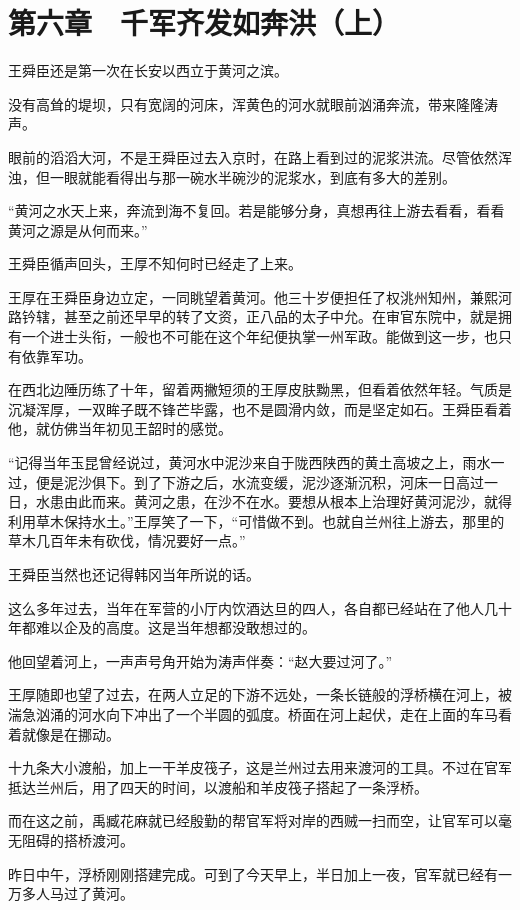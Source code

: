 \section{第六章　千军齐发如奔洪（上）}

王舜臣还是第一次在长安以西立于黄河之滨。

没有高耸的堤坝，只有宽阔的河床，浑黄色的河水就眼前汹涌奔流，带来隆隆涛声。

眼前的滔滔大河，不是王舜臣过去入京时，在路上看到过的泥浆洪流。尽管依然浑浊，但一眼就能看得出与那一碗水半碗沙的泥浆水，到底有多大的差别。

“黄河之水天上来，奔流到海不复回。若是能够分身，真想再往上游去看看，看看黄河之源是从何而来。”

王舜臣循声回头，王厚不知何时已经走了上来。

王厚在王舜臣身边立定，一同眺望着黄河。他三十岁便担任了权洮州知州，兼熙河路钤辖，甚至之前还早早的转了文资，正八品的太子中允。在审官东院中，就是拥有一个进士头衔，一般也不可能在这个年纪便执掌一州军政。能做到这一步，也只有依靠军功。

在西北边陲历练了十年，留着两撇短须的王厚皮肤黝黑，但看着依然年轻。气质是沉凝浑厚，一双眸子既不锋芒毕露，也不是圆滑内敛，而是坚定如石。王舜臣看着他，就仿佛当年初见王韶时的感觉。

“记得当年玉昆曾经说过，黄河水中泥沙来自于陇西陕西的黄土高坡之上，雨水一过，便是泥沙俱下。到了下游之后，水流变缓，泥沙逐渐沉积，河床一日高过一日，水患由此而来。黄河之患，在沙不在水。要想从根本上治理好黄河泥沙，就得利用草木保持水土。”王厚笑了一下，“可惜做不到。也就自兰州往上游去，那里的草木几百年未有砍伐，情况要好一点。”

王舜臣当然也还记得韩冈当年所说的话。

这么多年过去，当年在军营的小厅内饮酒达旦的四人，各自都已经站在了他人几十年都难以企及的高度。这是当年想都没敢想过的。

他回望着河上，一声声号角开始为涛声伴奏：“赵大要过河了。”

王厚随即也望了过去，在两人立足的下游不远处，一条长链般的浮桥横在河上，被湍急汹涌的河水向下冲出了一个半圆的弧度。桥面在河上起伏，走在上面的车马看着就像是在挪动。

十九条大小渡船，加上一干羊皮筏子，这是兰州过去用来渡河的工具。不过在官军抵达兰州后，用了四天的时间，以渡船和羊皮筏子搭起了一条浮桥。

而在这之前，禹臧花麻就已经殷勤的帮官军将对岸的西贼一扫而空，让官军可以毫无阻碍的搭桥渡河。

昨日中午，浮桥刚刚搭建完成。可到了今天早上，半日加上一夜，官军就已经有一万多人马过了黄河。

